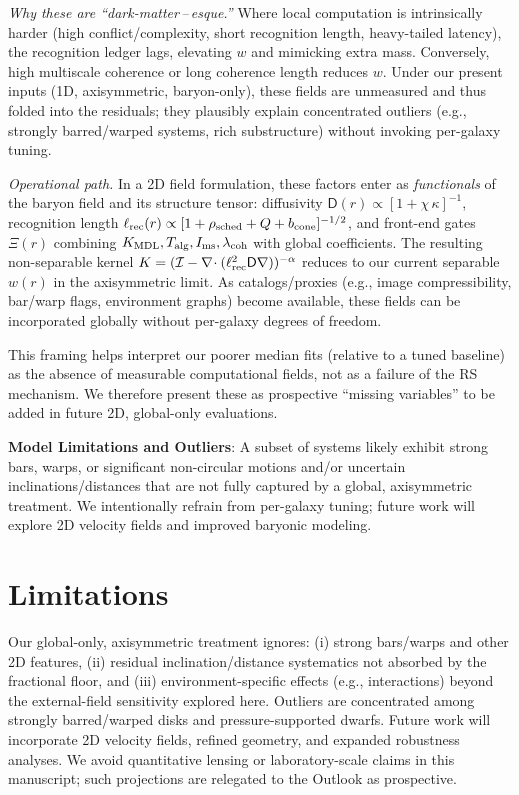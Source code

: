\documentclass[12pt,a4paper]{article}
\begin{document}
\noindent \emph{Why these are ``dark-matter\,--\,esque.''} Where local computation is intrinsically harder (high conflict/complexity, short recognition length, heavy-tailed latency), the recognition ledger lags, elevating $w$ and mimicking extra mass. Conversely, high multiscale coherence or long coherence length reduces $w$. Under our present inputs (1D, axisymmetric, baryon-only), these fields are unmeasured and thus folded into the residuals; they plausibly explain concentrated outliers (e.g., strongly barred/warped systems, rich substructure) without invoking per-galaxy tuning.

\noindent \emph{Operational path.} In a 2D field formulation, these factors enter as \emph{functionals} of the baryon field and its structure tensor: diffusivity $\mathsf D(r) \propto [1+\chi\,\kappa]^{-1}$, recognition length $\ell_{\rm rec}(r) \propto [1+\rho_{\rm sched}+Q+b_{\rm cone}]^{-1/2}$, and front-end gates $\Xi(r)$ combining $K_{\rm MDL}, T_{\rm alg}, I_{\rm ms}, \lambda_{\rm coh}$ with global coefficients. The resulting non-separable kernel $K=(\mathcal I-\nabla\!\cdot(\ell_{\rm rec}^2\mathsf D\nabla))^{-\alpha}$ reduces to our current separable $w(r)$ in the axisymmetric limit. As catalogs/proxies (e.g., image compressibility, bar/warp flags, environment graphs) become available, these fields can be incorporated globally without per-galaxy degrees of freedom.

\noindent This framing helps interpret our poorer median fits (relative to a tuned baseline) as the absence of measurable computational fields, not as a failure of the RS mechanism. We therefore present these as prospective ``missing variables'' to be added in future 2D, global-only evaluations.

\textbf{Model Limitations and Outliers}: A subset of systems likely exhibit strong bars, warps, or significant non-circular motions and/or uncertain inclinations/distances that are not fully captured by a global, axisymmetric treatment. We intentionally refrain from per-galaxy tuning; future work will explore 2D velocity fields and improved baryonic modeling.

\section{Limitations}
\noindent Our global-only, axisymmetric treatment ignores: (i) strong bars/warps and other 2D features, (ii) residual inclination/distance systematics not absorbed by the fractional floor, and (iii) environment-specific effects (e.g., interactions) beyond the external-field sensitivity explored here. Outliers are concentrated among strongly barred/warped disks and pressure-supported dwarfs. Future work will incorporate 2D velocity fields, refined geometry, and expanded robustness analyses. We avoid quantitative lensing or laboratory-scale claims in this manuscript; such projections are relegated to the Outlook as prospective.
\end{document}
